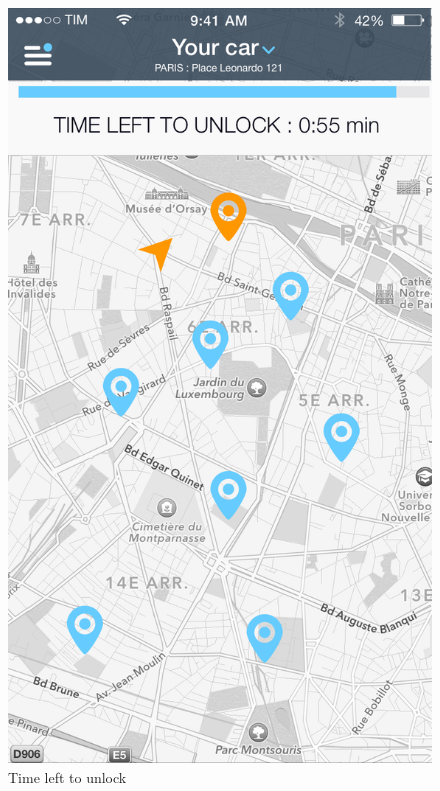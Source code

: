 \documentclass[12pt]{article}
\begin{document}
\begin{figure}
 	 	  \includegraphics[scale=0.25]{Images/TimeLeft.png}
		  \caption{Time left to unlock}
		  \endminipage
 	 	\end{figure}
 	 	
\end{document}
